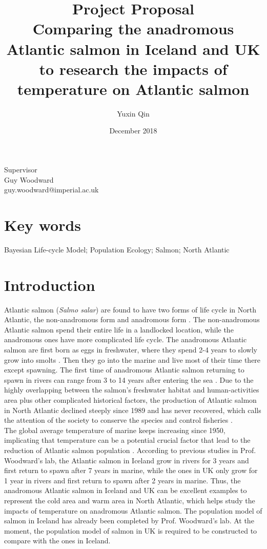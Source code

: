 \documentclass[11pt]{article}
\title{%
 Project Proposal\\
 \LARGE Comparing the anadromous Atlantic salmon in Iceland and UK to research the impacts of temperature on Atlantic salmon}
\author{Yuxin Qin }
\date{December 2018}
\begin{document}
\maketitle
\begin{center}
    \Large Supervisor\\
    \Large Guy Woodward\\
    \Large guy.woodward@imperial.ac.uk
\end{center}


\newpage
\begin{linenumbers}
\section{Key words}
Bayesian Life-cycle Model; Population Ecology; Salmon; North Atlantic
\section{Introduction}
Atlantic salmon (\textit{Salmo salar}) are found to have two forms of life cycle in North Atlantic, the non-anadromous form and anadromous form \cite{verspoor2007atlantic}. The non-anadromous Atlantic salmon spend their entire life in a landlocked location, while the anadromous ones have more complicated life cycle. The anadromous Atlantic salmon are first born as eggs in freshwater, where they spend 2-4 years to slowly grow into smolts \cite{verspoor2007atlantic}. Then they go into the marine and live most of their time there except spawning. The first time of anadromous Atlantic salmon returning to spawn in rivers can range from 3 to 14 years after entering the sea \cite{chaput2012overview}. Due to the highly overlapping between the salmon's freshwater habitat and human-activities area plus other complicated historical factors, the production of Atlantic salmon in North Atlantic declined steeply since 1989 and has never recovered, which calls the attention of the society to conserve the species and control fisheries \cite{parrish1998aren}.\\
The global average temperature of marine keeps increasing since 1950, implicating that temperature can be a potential crucial factor that lead to the reduction of Atlantic salmon population \cite{brohan2006uncertainty}. According to previous studies in Prof. Woodward's lab, the Atlantic salmon in Iceland grow in rivers for 3 years and first return to spawn after 7 years in marine, while the ones in UK only grow for 1 year in rivers and first return to spawn after 2 years in marine. Thus, the anadromous Atlantic salmon in Iceland and UK can be excellent examples to represent the cold area and warm area in North Atlantic, which helps study the impacts of temperature on anadromous Atlantic salmon. The population model of salmon in Iceland has already been completed by Prof. Woodward's lab. At the moment, the population model of salmon in UK is required to be constructed to compare with the ones in Iceland. 


\end{linenumbers}
\end{document}
